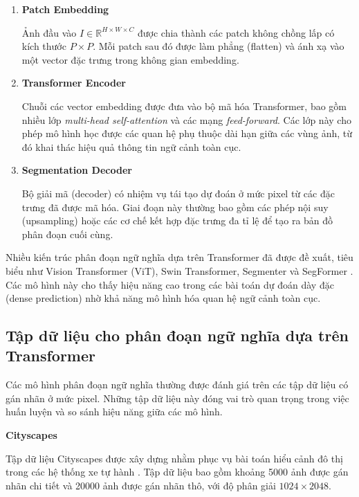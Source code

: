 \begin{enumerate}

\item \textbf{Patch Embedding}

Ảnh đầu vào $I \in \mathbb{R}^{H \times W \times C}$ được chia thành các patch không chồng lấp có kích thước $P \times P$. 
Mỗi patch sau đó được làm phẳng (flatten) và ánh xạ vào một vector đặc trưng trong không gian embedding.

\item \textbf{Transformer Encoder}

Chuỗi các vector embedding được đưa vào bộ mã hóa Transformer, bao gồm nhiều lớp \textit{multi-head self-attention} và các mạng \textit{feed-forward}. 
Các lớp này cho phép mô hình học được các quan hệ phụ thuộc dài hạn giữa các vùng ảnh, từ đó khai thác hiệu quả thông tin ngữ cảnh toàn cục.

\item \textbf{Segmentation Decoder}

Bộ giải mã (decoder) có nhiệm vụ tái tạo dự đoán ở mức pixel từ các đặc trưng đã được mã hóa. 
Giai đoạn này thường bao gồm các phép nội suy (upsampling) hoặc các cơ chế kết hợp đặc trưng đa tỉ lệ để tạo ra bản đồ phân đoạn cuối cùng.

\end{enumerate}

Nhiều kiến trúc phân đoạn ngữ nghĩa dựa trên Transformer đã được đề xuất, tiêu biểu như Vision Transformer (ViT), Swin Transformer, Segmenter và SegFormer \cite{dosovitskiy2020image,liu2021swin,xie2021segformer,strudel2021segmenter}. 
Các mô hình này cho thấy hiệu năng cao trong các bài toán dự đoán dày đặc (dense prediction) nhờ khả năng mô hình hóa quan hệ ngữ cảnh toàn cục.

\subsection{Tập dữ liệu cho phân đoạn ngữ nghĩa dựa trên Transformer}

Các mô hình phân đoạn ngữ nghĩa thường được đánh giá trên các tập dữ liệu có gán nhãn ở mức pixel. 
Những tập dữ liệu này đóng vai trò quan trọng trong việc huấn luyện và so sánh hiệu năng giữa các mô hình.

\textbf{Cityscapes}

Tập dữ liệu Cityscapes được xây dựng nhằm phục vụ bài toán hiểu cảnh đô thị trong các hệ thống xe tự hành \cite{cordts2016cityscapes}. 
Tập dữ liệu bao gồm khoảng 5000 ảnh được gán nhãn chi tiết và 20000 ảnh được gán nhãn thô, với độ phân giải $1024 \times 2048$.


